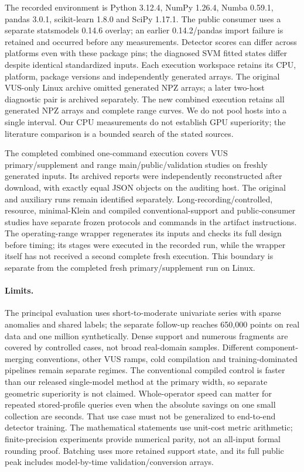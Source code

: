 The recorded environment is Python 3.12.4, NumPy 1.26.4, Numba 0.59.1,
pandas 3.0.1, scikit-learn 1.8.0 and SciPy 1.17.1. The public consumer uses
a separate statsmodels 0.14.6 overlay; an earlier 0.14.2/pandas import failure
is retained and occurred before any measurements. Detector scores can differ
across platforms even with these package pins; the diagnosed SVM fitted states
differ despite identical standardized inputs. Each execution workspace retains its CPU, platform,
package versions and independently generated arrays. The original VUS-only Linux archive omitted generated NPZ arrays; a later
two-host diagnostic pair is archived separately. The new combined execution
retains all generated NPZ arrays and complete range curves. We do not
pool hosts into a single interval. Our CPU measurements do not establish GPU superiority;
the literature comparison is a bounded search of the stated sources.

The completed combined one-command execution covers VUS primary/supplement
and range main/public/validation studies on freshly generated inputs. Its
archived reports were independently reconstructed after download, with
exactly equal JSON objects on the auditing host. The original and auxiliary
runs remain identified separately. Long-recording/controlled, resource, minimal-Klein and
compiled conventional-support and public-consumer studies
have separate frozen protocols and commands in the artifact instructions.
The operating-range wrapper regenerates its inputs and checks its full design
before timing; its stages were executed in the recorded run, while the wrapper
itself has not received a second complete fresh execution. This boundary is
separate from the completed fresh primary/supplement run on Linux.

\paragraph{Limits.}
The principal evaluation uses short-to-moderate univariate series with sparse
anomalies and shared labels; the separate follow-up reaches 650,000 points on
real data and one million synthetically. Dense support and numerous fragments
are covered by controlled cases, not broad real-domain samples. Different
component-merging conventions, other VUS ramps, cold compilation and
training-dominated pipelines remain separate regimes. The conventional compiled
control is faster than our released single-model method at the primary width,
so separate geometric superiority is not claimed. Whole-operator speed can
matter for repeated stored-profile queries even when the absolute savings on
one small collection are seconds. That use case must not be generalized to
end-to-end detector training. The mathematical statements use unit-cost metric
arithmetic; finite-precision experiments provide numerical parity, not an
all-input formal rounding proof. Batching uses more retained support state,
and its full public peak includes model-by-time validation/conversion arrays.

